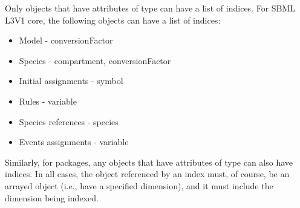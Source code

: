 Only objects that have attributes of  type can have a list of indices.  For SBML L3V1 core, the following objects can have a list of indices:
\begin{itemize}
\item Model - conversionFactor
\item Species - compartment, conversionFactor
\item Initial assignments - symbol
\item Rules - variable
\item Species references - species
\item Events assignments - variable
\end{itemize}
Similarly, for packages, any objects that have attributes of  type can also have indices.
In all cases, the object referenced by an index must, of course, be an arrayed object (i.e., have a specified dimension), and it must include the dimension being indexed.

